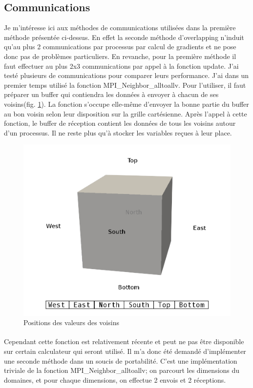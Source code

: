 \subsection{Communications}Je m'intéresse ici aux méthodes de communications utilisées dans la première méthode présentée ci-dessus. En effet la seconde méthode d'overlapping n'induit qu'au plus 2 communications par processus par calcul de gradients et ne pose donc pas de problèmes particuliers. En revanche, pour la première méthode il faut effectuer au plus 2x3 communications par appel à la fonction update. J'ai testé plusieurs de communications pour comparer leurs performance. J'ai dans un premier temps utilisé la fonction MPI\_Neighbor\_alltoallv. Pour l'utiliser, il faut préparer un buffer qui contiendra les données à envoyer à chacun de ses voisins(fig. \ref{fig:neighbor_pos}). La fonction s'occupe elle-même d'envoyer la bonne partie du buffer au bon voisin selon leur disposition sur la grille cartésienne. Après l'appel à cette fonction, le buffer de réception contient les données de tous les voisins autour d'un processus. Il ne reste plus qu'à stocker les variables reçues à leur place. 

\begin{figure}[h!]
  \centering
  \includegraphics[scale=0.3]{figures/neighbor_pos.png}
  \caption{\label{fig:neighbor_pos}Positions des valeurs des voisins}
\end{figure}

\paragraph{}Cependant cette fonction est relativement récente et peut ne pas être disponible sur certain calculateur qui seront utilisé. Il m'a donc été demandé d'implémenter une seconde méthode dans un soucis de portabilité. C'est une implémentation triviale de la fonction MPI\_Neighbor\_alltoallv; on parcourt les dimensions du domaines, et pour chaque dimensions, on effectue 2 envois et 2 réceptions.

